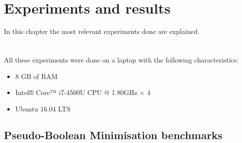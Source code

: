 
\chapter{Experiments and results} %

\label{Chapter9} %

In this chapter the most relevant experiments done are explained.\\\\\\
All these experiments were done on a laptop with the following characteristics:
\begin{itemize}
	\item 8 GB of RAM
	\item Intel® Core™ i7-4500U CPU @ 1.80GHz × 4 
	\item Ubuntu 16.04 LTS
\end{itemize}


\section{Pseudo-Boolean Minimisation benchmarks}

